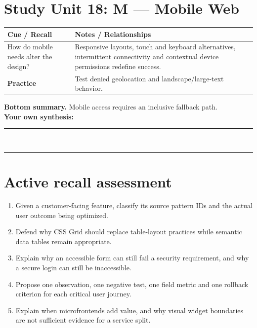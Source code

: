 \documentclass[11pt]{article}
\begin{document}
\section{Study Unit 18: M — Mobile Web}
\begin{longtable}{@{}p{.27\linewidth}p{.66\linewidth}@{}}\toprule
\textbf{Cue / Recall} & \textbf{Notes / Relationships}\\\midrule\endhead
How do mobile needs alter the design? & Responsive layouts, touch and keyboard alternatives, intermittent connectivity and contextual device permissions redefine success.\\
\addlinespace[4mm]
\textbf{Practice} & Test denied geolocation and landscape/large-text behavior.\\\bottomrule\end{longtable}
\begin{dosnotebox}\textbf{Bottom summary.} Mobile access requires an inclusive fallback path.\\[2mm]
\textbf{Your own synthesis:} \rule{.72\linewidth}{.4pt}\\[4mm]
\rule{.96\linewidth}{.4pt}\end{dosnotebox}

\section{Active recall assessment}

\begin{enumerate}
\item Given a customer-facing feature, classify its source pattern IDs and the actual user outcome being optimized.
\item Defend why CSS Grid should replace table-layout practices while semantic data tables remain appropriate.
\item Explain why an accessible form can still fail a security requirement, and why a secure login can still be inaccessible.
\item Propose one observation, one negative test, one field metric and one rollback criterion for each critical user journey.
\item Explain when microfrontends add value, and why visual widget boundaries are not sufficient evidence for a service split.
\end{enumerate}


\clearpage

\end{document}
